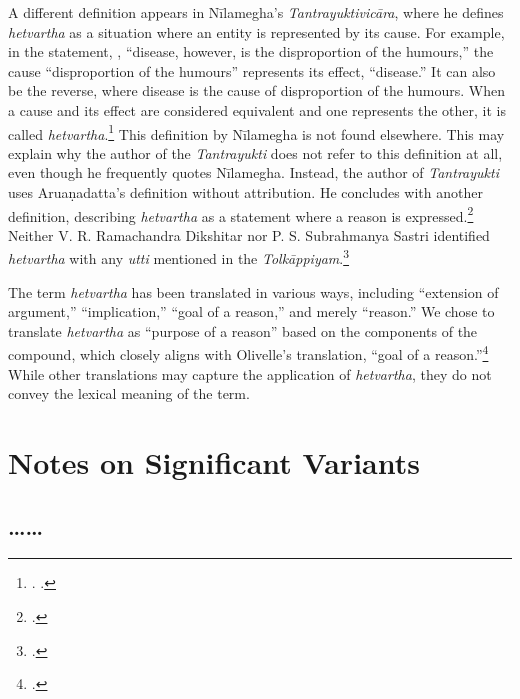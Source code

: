 A different definition appears in Nīlamegha's \emph{Tantrayuktivicāra}, 
where he defines \emph{hetvartha} as a situation 
where an entity is represented by its cause. 
For example, in the statement, , 
“disease, however, is the disproportion of the humours,” 
the cause “disproportion of the humours” represents its effect, “disease.” 
It can also be the reverse, 
where disease is the cause of disproportion of the humours. 
When a cause and its effect are considered equivalent 
and one represents the other, it is called \emph{hetvartha}.\footnote{%
	\begin{verse}
	\end{verse}
	. 
		\cite[4]{muth-1976}.} 
This definition by Nīlamegha is not found elsewhere. 
This may explain why the author of the \emph{Tantrayukti} 
does not refer to this definition at all, 
even though he frequently quotes Nīlamegha. 
Instead, the author of \emph{Tantrayukti} 
uses Aruaṇadatta's definition without attribution. 
He concludes with another definition, describing \emph{hetvartha} as a statement 
where a reason is expressed.\footnote{%
	\begin{verse}
	\end{verse}
	\cite[8]{nara-1949}.} 
Neither V. R. Ramachandra Dikshitar nor P. S. Subrahmanya Sastri 
identified \emph{hetvartha} with any \emph{utti} 
mentioned in the \emph{Tolkāppiyam}.\footcite[84]{chev-2009} 

The term \emph{hetvartha} has been translated in various ways, 
including “extension of argument,” “implication,” 
“goal of a reason,” and merely “reason.” 
We chose to translate \emph{hetvartha} as “purpose of a reason” 
based on the components of the compound, 
which closely aligns with Olivelle’s translation,
“goal of a reason.”\footcite[436]{oliv-2013}
While other translations may capture the application of \emph{hetvartha}, 
they do not convey the lexical meaning of the term.

\section{Notes on Significant Variants}

\subsection{\ldots{}\ldots}\label{yogan1}
	
